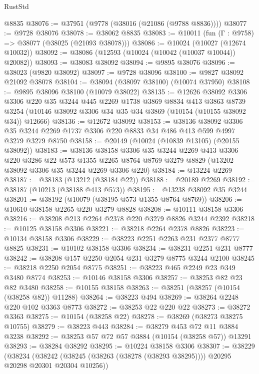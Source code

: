 \begin{lexlean}{RustStd}
\begin{coremodule}
    @8835
@38076 := @37951 (@9778 (@38016 (@21086 (@9788 @8836))))
@38077 := @9728 @38076
@38078 := @38062 @8835
@38083 := @10011 (fun (Γ : @9758) => @38077 (@38025 (@21093 @38078)))
@38086 := @10024 (@10027 (@12674 @10032))
@38092 := @38086 (@12593 (@10024 (@10042 (@10037 @10044)) @20082))
@38093 := @38083 @38092
@38094 := @9895 @38076
@38096 := @38023 (@9820 @38092)
@38097 := @9728 @38096
@38100 := @9827 @38092 @21092 @38078
@38104 := @38094 (@38097 @38100) (@10074 @37950)
@38108 := @9895 @38096 @38100 (@10079 @38022)
@38135 := @12626
    @38092
    @3306
    @3306
    @220
    @35
    @3244
    @445
    @2269
    @1738
    @3869
    @8834
    @413
    @3863
    @8739
    @3254
    (@10146 @38092 @3306 @34 @35 @34 @3869 (@10154 (@10155 @38092 @34)) @12666)
@38136 := @12672 @38092
@38153 := @38136
    @38092
    @3306
    @35
    @3244
    @2269
    @1737
    @3306
    @220
    @8833
    @34
    @486
    @413
    @599
    @4997
    @3279
    @3279
    @8750
@38158 := @20149 (@10024 (@10839 @13105) (@20155 @38092))
@38183 := @38136
    @38158
    @3306
    @35
    @3244
    @2269
    @413
    @3306
    @220
    @3286
    @22
    @573
    @1355
    @2265
    @8764
    @8769
    @3279
    @8829
    (@13202 @38092 @3306 @35 @3244 @2269 @3306 @220)
@38184 := @13224 @2269
@38187 := @38183 (@13212 (@38184 @22))
@38188 := @20189 @2269
@38192 := @38187 (@10213 (@38188 @413 @573))
@38195 := @13238 @38092 @35 @3244
@38201 := @38192 (@10079 (@38195 @573 @1355 @8764 @8769))
@38206 := @10610 @38158 @2265 @220 @3279 @8828
@38208 := @10111 @38158 @3306
@38216 := @38208 @213 @2264 @2378 @220 @3279 @8826 @3244 @2392
@38218 := @10125 @38158 @3306
@38221 := @38218 @2264 @2378 @8826
@38223 := @10134 @38158 @3306
@38229 := @38223 @2251 @2263 @231 @2377 @8777 @8825
@38231 := @10102 @38158 @3306
@38234 := @38231 @2251 @231 @8777
@38242 := @38208 @157 @2250 @2054 @231 @3279 @8775 @3244 @2100
@38245 := @38218 @2250 @2054 @8775
@38251 := @38223 @465 @2249 @23 @349 @3480 @8774
@38253 := @10146 @38158 @3306
@38257 := @38253 @82 @23 @82 @3480
@38258 := @10155 @38158
@38263 := @38251 (@38257 (@10154 (@38258 @82)) @11288)
@38264 := @38223 @494
@38269 := @38264 @2248 @220 @102 @3363 @8773
@38272 := @38253 @22 @220 @22
@38273 := @38272 @3363
@38275 := @10154 (@38258 @22)
@38278 := @38269 (@38273 @38275 @10755)
@38279 := @38223 @443
@38284 := @38279 @453 @72 @11 @3884 @3238
@38292 := @38253 @57 @72 @57 @3884 (@10154 (@38258 @57)) @13291
@38293 := @38284 @38292
@38295 := @10224 @38158 @3306
@38307 := @38229
    (@38234 (@38242 (@38245 (@38263 (@38278 (@38293 @38295)))) @20295 @20298 @20301 @20304 @10256))

\end{coremodule}
\end{lexlean}
